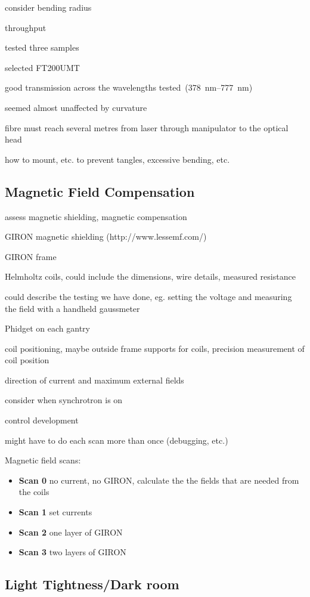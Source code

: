consider bending radius

throughput

tested three samples

selected FT200UMT

good transmission across the wavelengths tested~(\SIrange{378}{777}{\nano\metre})

seemed almost unaffected by curvature

fibre must reach several metres from laser through manipulator to the
optical head

how to mount, etc. to prevent tangles, excessive bending, etc.

\subsection{Magnetic Field Compensation}

assess magnetic shielding, magnetic compensation

GIRON magnetic shielding (http://www.lessemf.com/)

GIRON frame

Helmholtz coils, could include the dimensions, wire details,
measured resistance

could describe the testing we have done, eg. setting the voltage and
measuring the field with a handheld gaussmeter

Phidget on each gantry


coil positioning, maybe outside frame supports for coils, precision measurement of coil position

direction of current and maximum external fields

consider when synchrotron is on

control development

might have to do each scan more than once (debugging, etc.)

Magnetic field scans:
\begin{itemize}
\item{\bf Scan 0} no current, no GIRON, calculate the the fields that are needed from the coils
\item{\bf Scan 1} set currents
\item{\bf Scan 2} one layer of GIRON
\item{\bf Scan 3} two layers of GIRON
\end{itemize}


\subsection{Light Tightness/Dark room}

